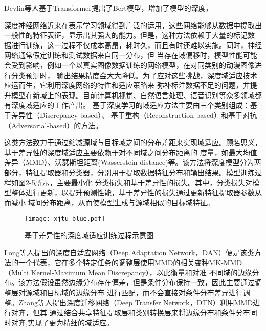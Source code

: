 Devlin等人\cite{devlin2018bert}基于Transformer提出了Bert模型，增加了模型的深度，

深度神经网络近来在表示学习领域得到广泛的运用，这些网络能够从数据中提取出一般性的特征表征，显示出其强大的能力。但是，这种方法依赖于大量的标记数
据进行训练，这一过程不仅成本高昂，耗时久，而且有时还难以实施。同时，神经网络通常假定训练和测试数据来自同一分布，但
当存在域偏移时，模型性能可能会受到影响\cite{farahani2021brief}，例如一个以真实图像数据训练的网络模型，在对同类别的动漫图像进行分类预测时，
输出结果精度会大大降低。为了应对这些挑战，深度域适应技术应运而生，它利用深度网络的特性和适应策略来
弥补标注数据不足的问题，并提升模型在新域上的表现。目前计算机视觉\cite{chen2018domain}、自然语言处理\cite{guo2020multi}、语音识别\cite{sun2017unsupervised}等众多领域都有深度域适应的工作产出。
基于深度学习的域适应方法主要由三个类别组成：基于差异性（Discrepancy-based）、
基于重构（Reconstruction-based）和基于对抗（Adversarial-based）的方法。

这类方法致力于通过缩减源域与目标域之间的分布差距来实现域适应。顾名思义，基于差异性的深度域适应主要依赖于对不同域之间分布距离的
度量，如最大均值差异（MMD）、沃瑟斯坦距离(Wasserstein distance)等。该方法将深度模型分为两部分，特征提取器和分类器，分别用于提取数据特征分布和输出结果。模型训练过程如图2-5所示，主要最小化
分类损失和基于差异性的损失。其中，分类损失对模型整体进行更新，以提升预测性能，基于差异性的损失通过更新特征提取器参数从而减小
域间分布距离，从而使模型生成与源域相似的目标域特征。
\begin{figure}[H]
    \centering
    \texttt{[image: xjtu\_blue.pdf]}
    \caption{基于差异性的深度域适应训练过程示意图}
\end{figure}

Long等人\cite{long2015learning}提出的深度自适应网络（Deep Adaptation Network，DAN）便是该类方法的一个代表，它在多个特定任务的调整层使用MMD的相关变种MK‐MMD（Multi Kernel‐Maximum Mean Discrepancy），以此衡量和对准
不同域的边缘分布。该方法假设虽然边缘分布存在偏差，但是条件分布保持一致，因此主要通过调整层对源域和目标域的边缘分布
进行匹配，而不会直接对条件分布差异进行调整。Zhang等人\cite{zhang2015deep}提出深度迁移网络（Deep Transfer Network，DTN）利用MMD进行对齐，但其
通过结合共享特征提取层和类别转换层来将边缘分布和条件分布同时对齐,实现了更为精细的域适应。

